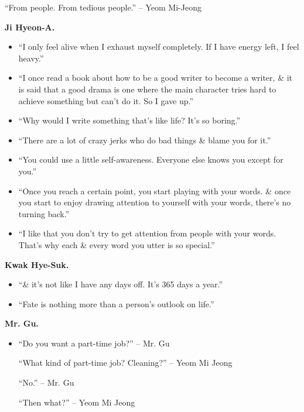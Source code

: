 \documentclass{article}
\begin{document}
\begin{enumerate}
\begin{itemize}
		``From people. From tedious people.'' -- Yeom Mi-Jeong
	\end{itemize}
	\textbf{Ji Hyeon-A.}
	\begin{itemize}
		\item ``I only feel alive when I exhaust myself completely. If I have energy left, I feel heavy.''
		\item ``I once read a book about how to be a good writer to become a writer, \& it is said that a good drama is one where the main character tries hard to achieve something but can't do it. So I gave up.''
		\item ``Why would I write something that's like life? It's so boring.''
		\item ``There are a lot of crazy jerks who do bad things \& blame you for it.''
		\item ``You could use a little self-awareness. Everyone else knows you except for you.''
		\item ``Once you reach a certain point, you start playing with your words. \& once you start to enjoy drawing attention to yourself with your words, there's no turning back.''
		\item ``I like that you don't try to get attention from people with your words. That's why each \& every word you utter is so special.''
	\end{itemize}
	\textbf{Kwak Hye-Suk.}
	\begin{itemize}
		\item ``\& it's not like I have any days off. It's 365 days a year.''
		\item ``Fate is nothing more than a person's outlook on life.''
	\end{itemize}
	\textbf{Mr. Gu.}
	\begin{itemize}
		\item ``Do you want a part-time job?'' -- Mr. Gu
		
		``What kind of part-time job? Cleaning?'' -- Yeom Mi Jeong
		
		``No.'' -- Mr. Gu
		
		``Then what?'' -- Yeom Mi Jeong
		

\end{itemize}
\end{enumerate}
\end{document}
